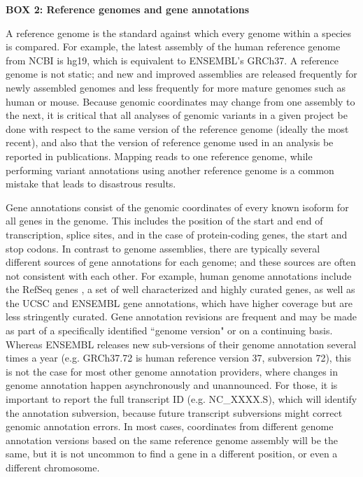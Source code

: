 \textbf{BOX 2: Reference genomes and gene annotations}
\begin{framed}
A reference genome is the standard against which every genome within a species is compared. For example, the latest assembly of the human reference genome from NCBI is hg19, which is equivalent to ENSEMBL’s GRCh37. A reference genome is not static; and new and improved assemblies are released frequently for newly assembled genomes and less frequently for more mature genomes such as human or mouse. Because genomic coordinates may change from one assembly to the next, it is critical that all analyses of genomic variants in a given project be done with respect to the same version of the reference genome (ideally the most recent), and also that the version of reference genome used in an analysis be reported in publications. Mapping reads to one reference genome, while performing variant annotations using another reference genome is a common mistake that leads to disastrous results.

Gene annotations consist of the genomic coordinates of every known isoform for all genes in the genome. This includes the position of the start and end of transcription, splice sites, and in the case of protein-coding genes, the start and stop codons. In contrast to genome assemblies, there are typically several different sources of gene annotations for each genome; and these sources are often not consistent with each other. For example, human genome annotations include the RefSeq genes  \cite{REF69}, a set of well characterized and highly curated genes, as well as the UCSC  \cite{REF70} and ENSEMBL  \cite{REF71} gene annotations, which have higher coverage but are less stringently curated. Gene annotation revisions are frequent and may be made as part of a specifically identified ``genome version" or on a continuing basis. Whereas ENSEMBL releases new sub-versions of their genome annotation several times a year (e.g. GRCh37.72 is human reference version 37, subversion 72), this is not the case for most other genome annotation providers, where changes in genome annotation happen asynchronously and unannounced. For those, it is important to report the full transcript ID (e.g. NC\_XXXX.S), which will identify the annotation subversion, because future transcript subversions might correct genomic annotation errors. In most cases, coordinates from different genome annotation versions based on the same reference genome assembly will be the same, but it is not uncommon to find a gene in a different position, or even a different chromosome.


\end{framed}
